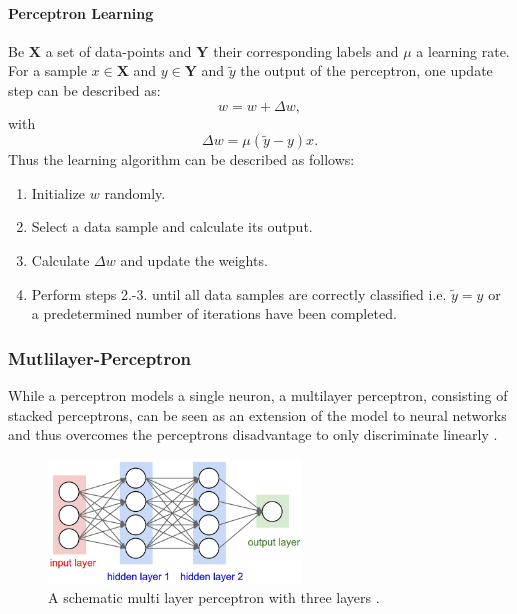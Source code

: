 \paragraph{Perceptron Learning} \label{c:perlearning}

Be $\textbf{X}$ a set of data-points and $\textbf{Y}$ their corresponding labels and $\mu$ a learning rate. 
For a sample $x \in \textbf{X}$  and $y \in \textbf{Y}$ and $\tilde{y}$ the output of the perceptron, one update step can be described as:
\[ 
	w = w + \Delta w,
\]
with 
\[
	\Delta w = \mu (\tilde{y}-y) x .
\]
Thus the learning algorithm can be described as follows:

\begin{enumerate}
	\item Initialize $w$ randomly.
	\item Select a data sample and calculate its output.
	\item Calculate $\Delta w$ and update the weights.
	\item Perform steps 2.-3. until all data samples are correctly classified i.e. $\tilde{y} = y$ or a predetermined number of iterations have been completed.
\end{enumerate}


\subsubsection{Mutlilayer-Perceptron} \label{c:mlp}

While a perceptron models a single neuron, a multilayer perceptron, consisting of stacked perceptrons, can be seen as an extension of the model to neural networks and thus overcomes the perceptrons disadvantage to only discriminate linearly \cite{rumelhart1985learning}\cite{Goodfellow-et-al-2016-Book}. 

\begin{figure}
	\centering
    	\includegraphics[width=0.6\textwidth]{imgs/mlp.jpeg} 
    \caption{A schematic multi layer perceptron with three layers \cite{mlpImg}.}
	\label{fig:mlp}
\end{figure}



